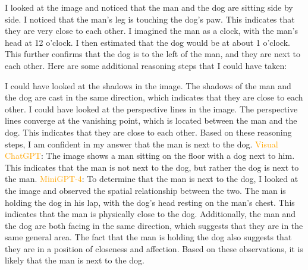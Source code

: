 \begin{enumerate}
        I looked at the image and noticed that the man and the dog are sitting side by side.
        I noticed that the man's leg is touching the dog's paw. This indicates that they are very close to each other.
        I imagined the man as a clock, with the man's head at 12 o'clock. I then estimated that the dog would be at about 1 o'clock. This further confirms that the dog is to the left of the man, and they are next to each other.
        Here are some additional reasoning steps that I could have taken:
        
        I could have looked at the shadows in the image. The shadows of the man and the dog are cast in the same direction, which indicates that they are close to each other.
        I could have looked at the perspective lines in the image. The perspective lines converge at the vanishing point, which is located between the man and the dog. This indicates that they are close to each other.
        Based on these reasoning steps, I am confident in my answer that the man is next to the dog.
        \subitem \textcolor{orange}{Visual ChatGPT}: The image shows a man sitting on the floor with a dog next to him. This indicates that the man is not next to the dog, but rather the dog is next to the man.
        \subitem \textcolor{orange}{MiniGPT-4}: To determine that the man is next to the dog, I looked at the image and observed the spatial relationship between the two. The man is holding the dog in his lap, with the dog’s head resting on the man’s chest. This indicates that the man is physically close to the dog. Additionally, the man and the dog are both facing in the same direction, which suggests that they are in the same general area. The fact that the man is holding the dog also suggests that they are in a position of closeness and affection. Based on these observations, it is likely that the man is next to the dog.
    \end{enumerate}
